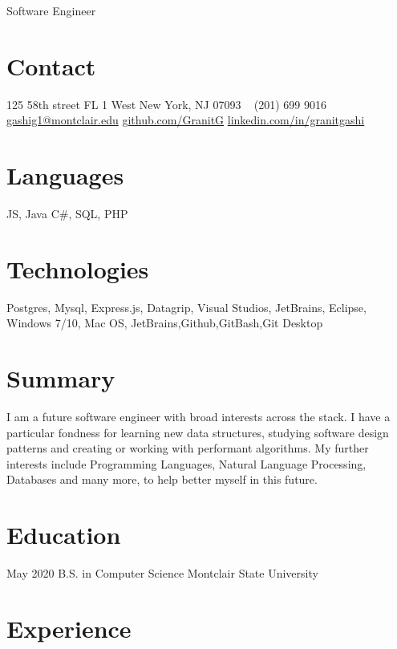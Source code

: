 \documentclass[]{friggeri-cv}
\begin{document}
       {Software Engineer}


\begin{aside} %
\section{\color{brown}Con\color{black}tact}
125 58th street FL 1
West New York, NJ 07093
~
(201) 699 9016
~
\href{mailto:gashig1@montclair.edu}{gashig1@montclair.edu}
\href{https://github.com/GranitG}{github.com/GranitG}
\href{https://www.linkedin.com/in/granitgashi/}{linkedin.com/in/granitgashi}
\section{\color{violet}Lang\color{black}uages}
{\large JS, Java}
{C\#, SQL, PHP}
\section{\color{olive}Tech\color{black}nologies}
{Postgres, Mysql, Express.js, Datagrip, Visual Studios, JetBrains, Eclipse, Windows 7/10, Mac OS, JetBrains,Github,GitBash,Git Desktop} 
\end{aside}

\section{Summary}

I am a future software engineer with broad interests across the stack. I have a particular fondness for learning new data structures, studying software design patterns and creating or working with performant algorithms. My further interests include Programming Languages, Natural Language Processing, Databases and many more, to help better myself in this future.

\section{Education}

\begin{entrylist}
\entry
{May 2020}
{B.S. {\normalfont in Computer Science}}
{Montclair State University}

\end{entrylist}

\section{Experience}
\end{document}
